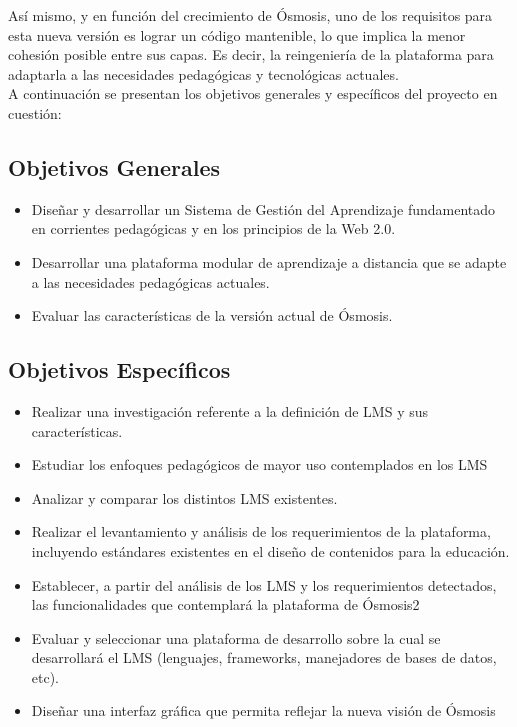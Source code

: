 Así mismo, y en función del crecimiento de Ósmosis, uno de los requisitos para esta nueva versión es lograr un código mantenible, lo que implica la menor cohesión posible entre sus capas. Es decir, la reingeniería de la plataforma para adaptarla a las necesidades pedagógicas y tecnológicas actuales.\\

A continuación se presentan los objetivos generales y específicos del proyecto en cuestión:

\subsection{Objetivos Generales}
\begin{itemize}
	\item Diseñar y desarrollar un Sistema de Gestión del Aprendizaje fundamentado en corrientes pedagógicas y en los principios de la Web 2.0.
	\item Desarrollar una plataforma modular de aprendizaje a distancia que se adapte a las necesidades pedagógicas actuales.
	\item Evaluar las características de la versión actual de Ósmosis.
\end{itemize}
	
\subsection{Objetivos Específicos}
\begin{itemize}
	\item Realizar una investigación referente a la definición de LMS y sus características.
	\item Estudiar los enfoques pedagógicos de mayor uso contemplados en los LMS
	\item Analizar y comparar los distintos LMS existentes.
	\item Realizar el levantamiento y análisis de los requerimientos de la plataforma, incluyendo estándares existentes en el diseño de contenidos para la educación.
	\item Establecer, a partir del análisis de los LMS y los requerimientos detectados, las funcionalidades que contemplará la plataforma de Ósmosis2
	\item Evaluar y seleccionar una plataforma de desarrollo sobre la cual se desarrollará el LMS (lenguajes, frameworks, manejadores de bases de datos, etc). 
	\item Diseñar una interfaz gráfica que permita reflejar la nueva visión de Ósmosis
\end{itemize}